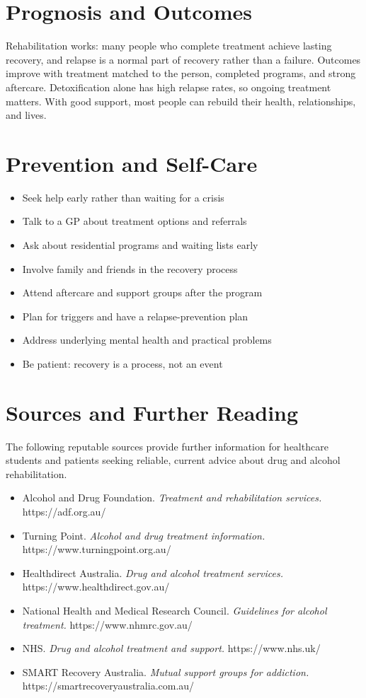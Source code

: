 \section*{Prognosis and Outcomes}
Rehabilitation works: many people who complete treatment achieve lasting recovery, and relapse is a normal part of recovery rather than a failure. Outcomes improve with treatment matched to the person, completed programs, and strong aftercare. Detoxification alone has high relapse rates, so ongoing treatment matters. With good support, most people can rebuild their health, relationships, and lives.

\section*{Prevention and Self-Care}
\begin{itemize}
    \item Seek help early rather than waiting for a crisis
    \item Talk to a GP about treatment options and referrals
    \item Ask about residential programs and waiting lists early
    \item Involve family and friends in the recovery process
    \item Attend aftercare and support groups after the program
    \item Plan for triggers and have a relapse-prevention plan
    \item Address underlying mental health and practical problems
    \item Be patient: recovery is a process, not an event
\end{itemize}

\section*{Sources and Further Reading}
The following reputable sources provide further information for healthcare students and patients seeking reliable, current advice about drug and alcohol rehabilitation.

\begin{itemize}
    \item Alcohol and Drug Foundation. \textit{Treatment and rehabilitation services.} https://adf.org.au/
    \item Turning Point. \textit{Alcohol and drug treatment information.} https://www.turningpoint.org.au/
    \item Healthdirect Australia. \textit{Drug and alcohol treatment services.} https://www.healthdirect.gov.au/
    \item National Health and Medical Research Council. \textit{Guidelines for alcohol treatment.} https://www.nhmrc.gov.au/
    \item NHS. \textit{Drug and alcohol treatment and support.} https://www.nhs.uk/
    \item SMART Recovery Australia. \textit{Mutual support groups for addiction.} https://smartrecoveryaustralia.com.au/
\end{itemize}
